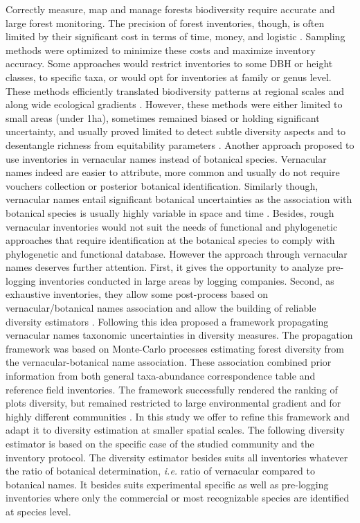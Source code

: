 \documentclass[fleqn,10pt]{ArtEcoFoG} %
\begin{document}
Correctly measure, map and manage forests biodiversity require accurate
and large forest monitoring. The precision of forest inventories,
though, is often limited by their significant cost in terms of time,
money, and logistic \citep{Feeley2011}. Sampling methods were optimized
to minimize these costs and maximize inventory accuracy. Some approaches
would restrict inventories to some DBH or height classes, to specific
taxa, or would opt for inventories at family or genus level. These
methods efficiently translated biodiversity patterns at regional scales
and along wide ecological gradients
\citep{Steege2000, Higgins2004, Rejou-Mechain2011, Pos2014}. However,
these methods were either limited to small areas (under 1ha), sometimes
remained biased or holding significant uncertainty, and usually proved
limited to detect subtle diversity aspects and to desentangle richness
from equitability parameters
\citetext{\citealp{Phillips2003a}; \citealp{Valencia2013}; \citealp[
]{Guitet2014b}; \citealp{Vellend2008}; \citealp{Prance1994}}. Another
approach proposed to use inventories in vernacular names instead of
botanical species. Vernacular names indeed are easier to attribute, more
common and usually do not require vouchers collection or posterior
botanical identification. Similarly though, vernacular names entail
significant botanical uncertainties as the association with botanical
species is usually highly variable in space and time
\citep{Oldeman1968}. Besides, rough vernacular inventories would not
suit the needs of functional and phylogenetic approaches that require
identification at the botanical species to comply with phylogenetic and
functional database. However the approach through vernacular names
deserves further attention. First, it gives the opportunity to analyze
pre-logging inventories conducted in large areas by logging companies.
Second, as exhaustive inventories, they allow some post-process based on
vernacular/botanical names association and allow the building of
reliable diversity estimators
\citep{TerSteege2006, Feldpausch2006, Rejou-Mechain2008, Rejou-Mechain2011}.
Following this idea \citet{Guitet2014b} proposed a framework propagating
vernacular names taxonomic uncertainties in diversity measures. The
propagation framework was based on Monte-Carlo processes estimating
forest diversity from the vernacular-botanical name association. These
association combined prior information from both general taxa-abundance
correspondence table \citep{De2009} and reference field inventories. The
framework successfully rendered the ranking of plots diversity, but
remained restricted to large environmental gradient and for highly
different communities \citep{Guitet2014b, Guitet2013}. In this study we
offer to refine this framework and adapt it to diversity estimation at
smaller spatial scales. The following diversity estimator is based on
the specific case of the studied community and the inventory protocol.
The diversity estimator besides suits all inventories whatever the ratio
of botanical determination, \emph{i.e.} ratio of vernacular compared to
botanical names. It besides suits experimental specific as well as
pre-logging inventories where only the commercial or most recognizable
species are identified at species level.
\end{document}
